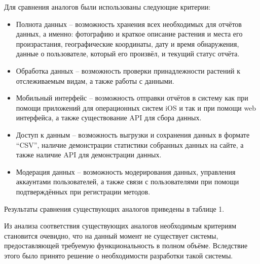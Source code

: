\nwln
Для сравнения аналогов были использованы следующие критерии:

\begin{itemize}[topsep=0pt, parsep=0pt, itemsep=0pt, leftmargin=*, labelindent=0.5cm]
	\item Полнота данных -- возможность хранения всех необходимых для отчётов данных, а именно: фотографию и краткое описание растения и места его произрастания, географические координаты, дату и время обнаружения, данные о пользователе, который его произвёл, и текущий статус отчёта.
	\item Обработка данных -- возможность проверки принадлежности растений к отслеживаемым видам, а также работы с данными.
	\item Мобильный интерфейс -- возможность отправки отчётов в систему как при помощи приложений для операционных систем iOS и  так и при помощи web интерфейса, а также существование API для сбора данных.
	\item Доступ к данным -- возможность выгрузки и сохранения данных в формате “CSV”, наличие демонстрации статистики собранных данных на сайте, а также наличие API для демонстрации данных.
	\item Модерация данных -- возможность модерирования данных, управления аккаунтами пользователей, а также связи с пользователями при помощи подтверждённых при регистрации методов.
\end{itemize}

\nwln
Результаты сравнения существующих аналогов приведены в таблице 1. \\
\tableone

\nwln
Из анализа соответствия существующих аналогов необходимым критериям становится очевидно, что на данный момент не существует системы, предоставляющей требуемую функциональность в полном объёме.
Вследствие этого было принято решение о необходимости разработки такой системы.
